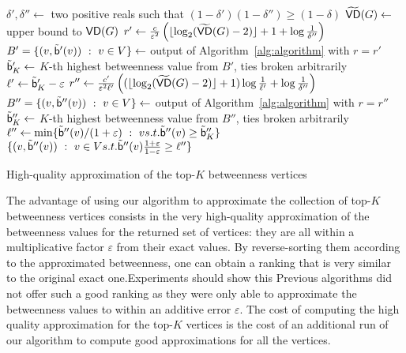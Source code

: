 \begin{algorithm}[h]
   \DontPrintSemicolon
  $\delta',\delta''\leftarrow$ two positive reals such that
  $(1-\delta')(1-\delta'')\ge(1-\delta)$\;
  $\widetilde{\mathsf{VD}}(G)\leftarrow$ upper bound to $\mathsf{VD}(G)$\;
  $r'\leftarrow\frac{c}{\varepsilon^2}\left(\lfloor\log_2(\widetilde{\mathsf{VD}}(G)-2)\rfloor+1+\log\frac{1}{\delta''}\right)$\;
  $B'=\{(v,\tilde{\mathsf{b}}'(v)) ~:~ v\in V\}\leftarrow$ output of Algorithm~\ref{alg:algorithm} with $r=r'$\;
  $\tilde{\mathsf{b}}_K'\leftarrow$ $K$-th highest betweenness value from $B'$, ties
  broken arbitrarily\;
  $\ell'\leftarrow\tilde{\mathsf{b}}_K'-\varepsilon$\;
  $r''\leftarrow\frac{c'}{\varepsilon^2\ell'}\left((\lfloor\log_2(\widetilde{\mathsf{VD}}(G)-2)\rfloor+1)\log\frac{1}{\ell'}+\log\frac{1}{\delta''}\right)$\;
  $B''=\{(v,\tilde{\mathsf{b}}''(v)) ~:~ v\in V\}\leftarrow$ output of
  Algorithm~\ref{alg:algorithm} with $r=r''$\;
  $\tilde{\mathsf{b}}_K''\leftarrow$ $K$-th highest betweenness value from $B''$, ties
  broken arbitrarily\;
  $\ell''\leftarrow\min\{\tilde{\mathsf{b}}''(v)/(1+\varepsilon) ~:~ v \relax{ s.t. }
  \tilde{\mathsf{b}}''(v)\ge\tilde{\mathsf{b}}_K''\}$\;
  \Return $\{(v,\tilde{\mathsf{b}}''(v)) ~:~ v\in V \relax{ s.t. }
  \tilde{\mathsf{b}}''(v)\frac{1+\varepsilon}{1-\varepsilon}\ge\ell''\}$\;
  \caption{High-quality approximation of the top-$K$ betweenness vertices}
  \label{alg:topk}
\end{algorithm}

The advantage of using our algorithm to approximate the collection of top-$K$
betweenness vertices consists in the very high-quality approximation of the
betweenness values for the returned set of vertices: they are all within a
multiplicative factor $\varepsilon$ from their exact values. By reverse-sorting
them according to the approximated betweenness, one can obtain a ranking that is
very similar to the original exact one.\XXX Experiments should show this
Previous algorithms did not offer such a good ranking as they were only able to
approximate the betweenness values to within an additive error $\varepsilon$.
The cost of computing the high quality approximation for the top-$K$ vertices is
the cost of an additional run of our algorithm to compute good approximations
for all the vertices.

